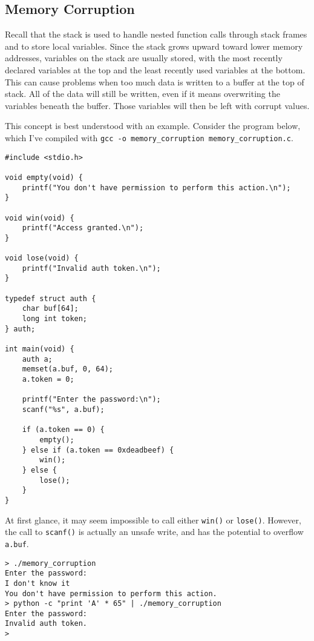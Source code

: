 
\subsection{Memory Corruption}
Recall that the stack is used to handle nested function calls through stack
frames and to store local variables. Since the stack grows upward toward lower
memory addresses, variables on the stack are usually stored, with the most
recently declared variables at the top and the least recently used variables at
the bottom. This can cause problems when too much data is written to a buffer
at the top of stack. All of the data will still be written, even if it means
overwriting the variables beneath the buffer. Those variables will then be left
with corrupt values.

This concept is best understood with an example. Consider the program below,
which I've compiled with \texttt{gcc -o memory\_corruption
memory\_corruption.c}.

\begin{lstlisting}
#include <stdio.h>

void empty(void) {
    printf("You don't have permission to perform this action.\n");
}

void win(void) {
    printf("Access granted.\n");
}

void lose(void) {
    printf("Invalid auth token.\n");
}

typedef struct auth {
    char buf[64];
    long int token;
} auth;

int main(void) {
    auth a;
    memset(a.buf, 0, 64);
    a.token = 0;

    printf("Enter the password:\n");
    scanf("%s", a.buf);

    if (a.token == 0) {
        empty();
    } else if (a.token == 0xdeadbeef) {
        win();
    } else {
        lose();
    }
}
\end{lstlisting}

At first glance, it may seem impossible to call either \texttt{win()} or
\texttt{lose()}. However, the call to \texttt{scanf()} is actually an unsafe
write, and has the potential to overflow \texttt{a.buf}.

\begin{lstlisting}
> ./memory_corruption 
Enter the password:
I don't know it
You don't have permission to perform this action.
> python -c "print 'A' * 65" | ./memory_corruption 
Enter the password:
Invalid auth token.
>
\end{lstlisting}

